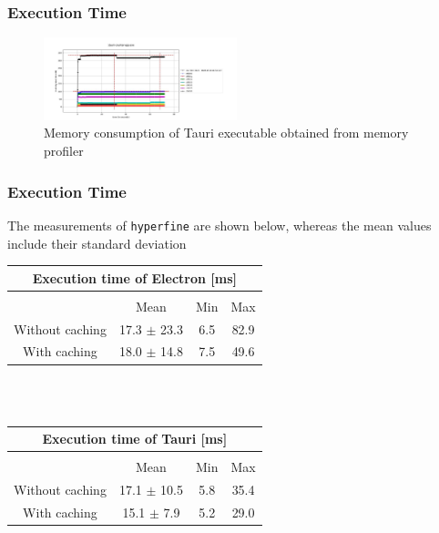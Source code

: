 \subsubsection{Execution Time}

\begin{figure}[ht]
    \centering
    \includegraphics[width=0.5\textwidth]{images/TauriMemCons.jpeg}
    \caption[Bla]{Memory consumption of Tauri executable obtained from memory profiler}
    \label{fig:tauri:memory}
\end{figure}
\subsubsection{Execution Time}
\label{subsubsec:perf:execution}
The measurements of \texttt{hyperfine} are shown below, whereas the mean values include their standard deviation
\begin{tabular} {| c | c | c | c |}

    \hline
    \multicolumn{4}{|c|}{Execution time of Electron [ms]} \\ \hline
     \multicolumn{4}{|c|}{}\\ \hline
     & Mean   & Min & Max     \\ \hline
    Without caching & 17.3 $\pm$ 23.3 & 6.5 & 82.9  \\ \hline
    With caching & 18.0 $\pm$ 14.8 & 7.5 & 49.6 \\ \hline
\end{tabular} \\ \\


\begin{tabular} {| c | c | c | c |}

    \hline
    \multicolumn{4}{|c|}{Execution time of Tauri [ms]} \\ \hline
    \multicolumn{4}{|c|}{}\\ \hline
    & Mean & Min & Max     \\ \hline
    Without caching & 17.1 $\pm$ 10.5 & 5.8 & 35.4  \\ \hline
    With caching & 15.1 $\pm$ 7.9 & 5.2 & 29.0 \\ \hline

\end{tabular} \\ \\
